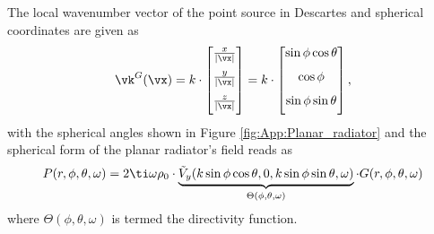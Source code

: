 The local wavenumber vector of the point source in Descartes and spherical coordinates are given as
\begin{equation}
\vk^G(\vx) = 
k \cdot \begin{bmatrix} \frac{x}{|\vx|}  \\[.7em] \frac{y}{|\vx|} \\[.7em] \frac{z}{|\vx|}\\[0.5em]  \end{bmatrix}
=
k \cdot \begin{bmatrix} \sin \phi \cos \theta \\[.7em] \cos \phi  \\[.7em]  \sin \phi \sin \theta \\[0.5em]  \end{bmatrix},
\label{Eq:App:ps_k_vec}
\end{equation}
with the spherical angles shown in Figure \ref{fig:App:Planar_radiator} and the spherical form of the planar radiator's field reads as
\begin{equation}
P(r,\phi,\theta,\omega) = 
2 \ti \omega \rho_0 \cdot \underbrace{\tilde{V}_{y}(k \sin \phi \cos \theta ,0,k \sin \phi \sin \theta ,\omega) }_{\Theta(\phi,\theta,\omega)}
\cdot G(r,\phi,\theta,\omega) 
\label{Eq:App:directive_monopole}
\end{equation}
where $\Theta(\phi,\theta,\omega)$ is termed the directivity function.

